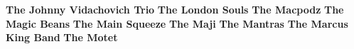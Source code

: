 \vspace{10pt} 
\newline
\vspace{10pt} 
\noindent \textbf{The Johnny Vidachovich Trio}\newline
\vspace{10pt} 
\newline
\vspace{10pt} 
\noindent \textbf{The London Souls}\newline
\vspace{10pt} 
\newline
\vspace{10pt} 
\noindent \textbf{The Macpodz}\newline
\vspace{10pt} 
\newline
\vspace{10pt} 
\noindent \textbf{The Magic Beans}\newline
\vspace{10pt} 
\newline
\vspace{10pt} 
\noindent \textbf{The Main Squeeze}\newline
\vspace{10pt} 
\newline
\vspace{10pt} 
\noindent \textbf{The Maji}\newline
\vspace{10pt} 
\newline
\vspace{10pt} 
\noindent \textbf{The Mantras}\newline
\vspace{10pt} 
\newline
\vspace{10pt} 
\noindent \textbf{The Marcus King Band}\newline
\vspace{10pt} 
\newline
\vspace{10pt} 
\noindent \textbf{The Motet}\newline
\vspace{10pt} 
\newline
